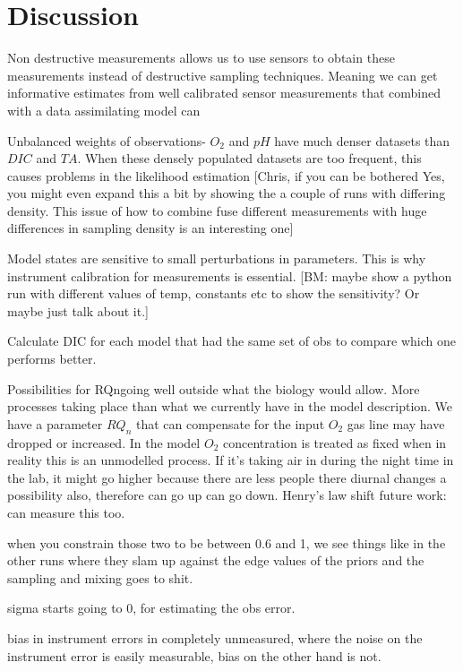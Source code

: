 \documentclass{ruthesis}
\begin{document}
\FloatBarrier
\section{Discussion}

Non destructive measurements allows us to use sensors to obtain these measurements instead of destructive sampling techniques. Meaning we can get informative estimates from well calibrated sensor measurements that combined with a data assimilating model can 

Unbalanced weights of observations- $O_2$ and $pH$ have much denser datasets than $DIC$ and $TA$. When these densely populated datasets are too frequent, this causes problems in the likelihood estimation 
[Chris, if you can be bothered Yes,  you might even expand this a bit by showing the a couple of runs with differing density.  This issue of how to combine  fuse different measurements with huge differences in sampling density is an interesting one]

Model states are sensitive to small perturbations in parameters. This is why instrument calibration for measurements is essential. [BM: maybe show a python run with different values of temp, constants etc to show the sensitivity? Or maybe just talk about it.] 

Calculate DIC for each model that had the same set of obs to compare which one performs better.

Possibilities for RQngoing well outside what the biology would allow. 
More processes taking place than what we currently have in the model description. We have a parameter $RQ_n$ that can compensate for the input $O_2$ gas line may have dropped or increased.
In the model $O_2$ concentration is treated as fixed when in reality this is an unmodelled process. If it's taking air in during the night time in the lab, it might go higher because there are less people there 
diurnal changes a possibility also, therefore can go up can go down.
Henry's law shift 
future work: can measure this too.

when you constrain those two to be between 0.6 and 1, we see things like in the other runs where they slam up against the edge values of the priors and the sampling and mixing goes to shit.

sigma starts going to 0, for estimating the obs error.

bias in instrument errors in completely unmeasured, where the noise on the instrument error is easily measurable, bias on the other hand is not.
\end{document}
